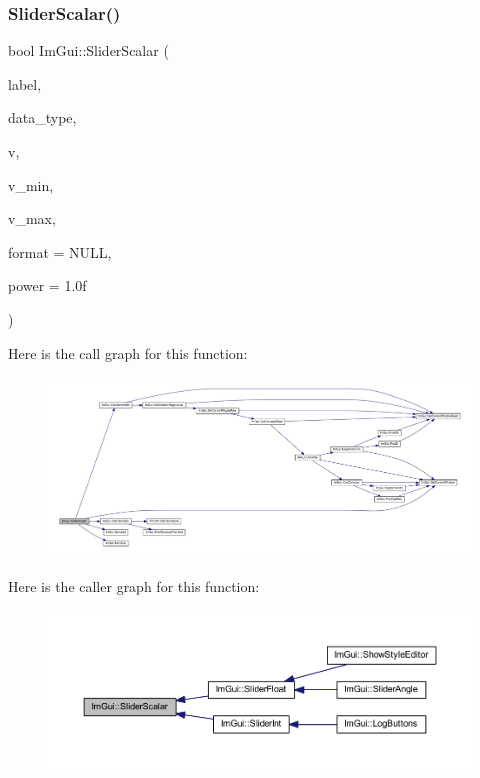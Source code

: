 \subsubsection{\texorpdfstring{Slider\+Scalar()}{SliderScalar()}}
{\footnotesize\ttfamily bool Im\+Gui\+::\+Slider\+Scalar (\begin{DoxyParamCaption}\item[{const char $\ast$}]{label,  }\item[{\mbox{\hyperlink{imgui_8h_a4cfa8697a3d76722fff83eb18922e9d5}{Im\+Gui\+Data\+Type}}}]{data\+\_\+type,  }\item[{void $\ast$}]{v,  }\item[{const void $\ast$}]{v\+\_\+min,  }\item[{const void $\ast$}]{v\+\_\+max,  }\item[{const char $\ast$}]{format = {\ttfamily NULL},  }\item[{float}]{power = {\ttfamily 1.0f} }\end{DoxyParamCaption})}

Here is the call graph for this function\+:
\nopagebreak
\begin{figure}[H]
\begin{center}
\leavevmode
\includegraphics[width=350pt]{namespace_im_gui_acc71e7cef0759bcff8577e6e37370dcf_cgraph}
\end{center}
\end{figure}
Here is the caller graph for this function\+:
\nopagebreak
\begin{figure}[H]
\begin{center}
\leavevmode
\includegraphics[width=350pt]{namespace_im_gui_acc71e7cef0759bcff8577e6e37370dcf_icgraph}
\end{center}
\end{figure}
\mbox{\label{namespace_im_gui_a2bb2e8ade96b0b2e64bd12d9db3515d3}} 
